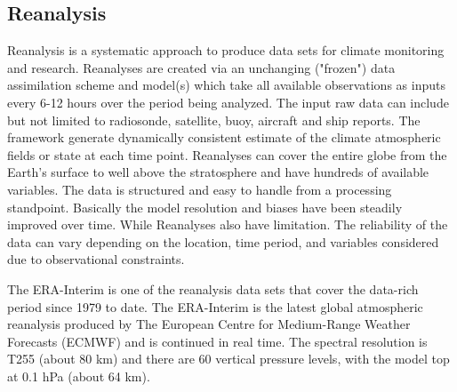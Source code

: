 \subsection{Reanalysis}
Reanalysis is a systematic approach to produce data sets for climate monitoring and research\cite{Reanalysis}. Reanalyses are created via an unchanging ("frozen") data assimilation scheme and model(s) which take all available observations as inputs every 6-12 hours over the period being analyzed. The input raw data can include but not limited to radiosonde, satellite, buoy, aircraft and ship reports. The framework generate dynamically consistent estimate of the climate atmospheric fields or state at each time point. Reanalyses can cover the entire globe from the Earth’s surface to well above the stratosphere and have hundreds of available variables. The data is structured and easy to handle from a processing standpoint. Basically the model resolution and biases have been steadily improved over time. While Reanalyses also have limitation. The reliability of the data can vary depending on the location, time period, and variables considered due to observational constraints. 

The ERA-Interim is one of the reanalysis data sets that cover the data-rich period since 1979 to date. The ERA-Interim is the latest global atmospheric reanalysis produced by The European Centre for Medium-Range Weather Forecasts (ECMWF) and is continued in real time. The spectral resolution is T255 (about 80 km) and there are 60 vertical pressure levels, with the model top at 0.1 hPa (about 64 km). 

